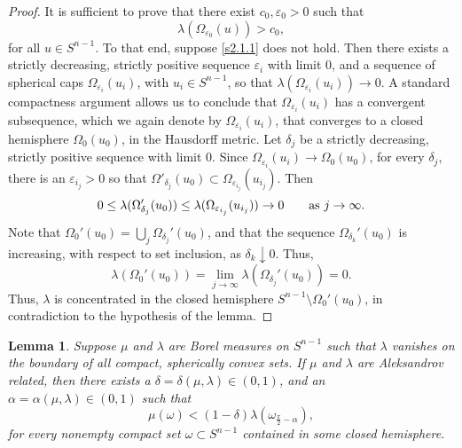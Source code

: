 \documentclass{cpamart1}     %
\newtheorem{lemm}[theo]{Lemma}
\theoremstyle{definition}
\theoremstyle{remark}
\newcommand{\sn}{S^{n-1}}
\begin{document}
\begin{proof}
It is sufficient to prove that there exist $c_0,\varepsilon_0 > 0$ such that
\begin{equation}\label{s2.1.1}
\lambda(\Omega_{\varepsilon_0}(u)) > c_0,
\end{equation}
for all $u\in\sn$.
To that end, suppose \eqref{s2.1.1} does not hold. Then there exists a strictly decreasing,
strictly positive sequence $\varepsilon_i$ with limit 0, and a sequence of spherical
caps $\Omega_{\varepsilon_i}(u_i)$, with $u_i\in\sn$,
so that $\lambda(\Omega_{\varepsilon_i}(u_i)) \to 0$. A standard compactness
argument allows us to conclude that
$\Omega_{\varepsilon_i}(u_i)$ has a convergent subsequence, which we again denote by
$\Omega_{\varepsilon_i}(u_i)$, that converges to a closed hemisphere $\Omega_0(u_0)$,
in the Hausdorff metric.
Let $\delta_j$ be a strictly decreasing, strictly positive sequence with limit $0$.
Since $\Omega_{\varepsilon_i}(u_i)\to\Omega_0(u_0)$, for every $\delta_j$, there is an
$\varepsilon_{i_j}>0$ so that
$\Omega'_{\delta_j}(u_0) \subset \Omega_{\varepsilon_{i_j}}(u_{i_j})$. Then
\[
\text{$0\le \lambda(\Omega'_{\delta_j}(u_0)) \le \lambda(\Omega_{\varepsilon_{i_j}}(u_{i_j}))
 \to 0$\qquad as\ $j\to\infty$.}
\]
Note that $\Omega_0'(u_0) = \bigcup_{j} \Omega_{\delta_j}'(u_0)$, and that the sequence
$\Omega_{\delta_k}'(u_0)$ is increasing, with respect to set inclusion, as $\delta_k \downarrow 0$.
Thus,
\[
\lambda(\Omega_0'(u_0)) = \lim_{j \to \infty} \lambda(\Omega_{\delta_j}'(u_0)) = 0.
\]
Thus, $\lambda$ is concentrated in the closed hemisphere $\sn \setminus \Omega_0'(u_0)$, in
contradiction to the hypothesis of the lemma.
\end{proof}








\begin{lemm}\label{s2.1}
Suppose $\mu$ and $\lambda$ are Borel measures on $\sn$
such that
$\lambda$ vanishes on the boundary of all compact, spherically convex sets.
If $\mu$ and $\lambda$ are Aleksandrov related, then there exists a
$\delta=\delta(\mu,\lambda)\in(0,1)$, and an $\alpha=\alpha(\mu,\lambda) \in(0,1)$ such that
\begin{equation}\label{s2.2}
\mu(\omega)<(1-\delta) \lambda(\omega_{\frac\pi2-\alpha}),
\end{equation}
for every nonempty compact set $\omega\subset S^{n-1}$ contained in some closed hemisphere.
\end{lemm}
\end{document}
